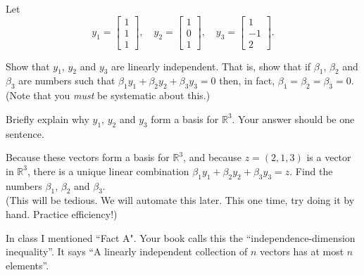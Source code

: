 \documentclass[minion]{homework}
\newcommand{\Reals}{\mathbb{R}}
\begin{document}
\begin{problems}
    \problem Let
    \[
        y_1= \begin{bmatrix} 1\\ 1 \\ 1\end{bmatrix},\quad
        y_2= \begin{bmatrix} 1\\ 0 \\ 1\end{bmatrix},\quad
        y_3= \begin{bmatrix} 1\\ -1 \\ 2\end{bmatrix}.
    \]
    \begin{subproblems}
        \item Show that $y_1$, $y_2$ and $y_3$ are linearly independent. That is, 
        show that if $\beta_1$, $\beta_2$ and $\beta_3$ are numbers such that
        $\beta_1 y_1 + \beta_2 y_2 + \beta_3 y_3 = 0$ then, in fact, $\beta_1=\beta_2=\beta_3=0$.\\
        (Note that you \emph{must} be systematic about this.)
        \item Briefly explain why $y_1$, $y_2$ and $y_3$ form a basis for $\Reals^3$. Your answer should be one sentence.
        \item Because these vectors form a basis for $\Reals^3$, and because
        $z=(2, 1, 3)$ is a vector in $\Reals^3$, there is a unique linear
        combination $\beta_1 y_1 + \beta_2 y_2 + \beta_3 y_3 = z$.  Find the
        numbers $\beta_1$, $\beta_2$ and $\beta_3$.  \\
        (This will be tedious. We will automate this later. This one time, try doing it by hand. Practice efficiency!)
    \end{subproblems}
    \problem In class I mentioned ``Fact A".  Your book calls this the 
    ``independence-dimension inequality''.  It says ``A linearly independent collection of $n$ vectors has at most $n$ elements''.



\end{problems}
\end{document}
